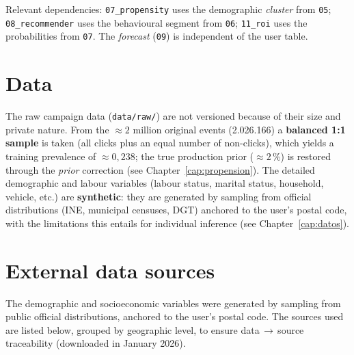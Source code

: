 Relevant dependencies: \texttt{07\_propensity} uses the demographic \textit{cluster} from \texttt{05}; \texttt{08\_recommender} uses the behavioural segment from \texttt{06}; \texttt{11\_roi} uses the probabilities from \texttt{07}. The \textit{forecast} (\texttt{09}) is independent of the user table.

\section{Data}

The raw campaign data (\texttt{data/raw/}) are not versioned because of their size and private nature. From the $\approx 2$ million original events (2.026.166) a \textbf{balanced 1:1 sample} is taken (all clicks plus an equal number of non-clicks), which yields a training prevalence of $\approx 0{,}238$; the true production prior ($\approx 2$\,\%) is restored through the \textit{prior} correction (see Chapter~\ref{cap:propension}). The detailed demographic and labour variables (labour status, marital status, household, vehicle, etc.) are \textbf{synthetic}: they are generated by sampling from official distributions (INE, municipal censuses, DGT) anchored to the user's postal code, with the limitations this entails for individual inference (see Chapter~\ref{cap:datos}).

\section{External data sources}

The demographic and socioeconomic variables were generated by sampling from public official distributions, anchored to the user's postal code. The sources used are listed below, grouped by geographic level, to ensure data\,$\rightarrow$\,source traceability (downloaded in January 2026).

